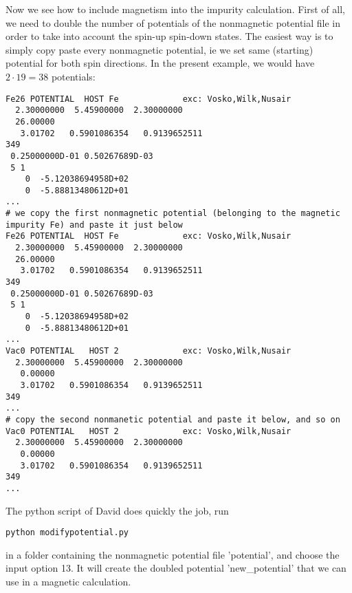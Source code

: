 \documentclass[a4paper,10pt,fullpage]{report}
\begin{document}
Now we see how to include magnetism into the impurity calculation. 
First of all, we need to double the number of potentials of the nonmagnetic potential file in order
to take into account the spin-up spin-down states. 
The easiest way is to simply copy paste every nonmagnetic potential, 
ie we set same (starting) potential for both spin directions. In the present example, we
would have $2\cdot19=38$ potentials:
\begin{verbatim}
Fe26 POTENTIAL  HOST Fe             exc: Vosko,Wilk,Nusair
  2.30000000  5.45900000  2.30000000
  26.00000
   3.01702   0.5901086354   0.9139652511
349
 0.25000000D-01 0.50267689D-03
 5 1
    0  -5.12038694958D+02
    0  -5.88813480612D+01
...
# we copy the first nonmagnetic potential (belonging to the magnetic impurity Fe) and paste it just below
Fe26 POTENTIAL  HOST Fe             exc: Vosko,Wilk,Nusair
  2.30000000  5.45900000  2.30000000
  26.00000
   3.01702   0.5901086354   0.9139652511
349
 0.25000000D-01 0.50267689D-03
 5 1
    0  -5.12038694958D+02
    0  -5.88813480612D+01
...
Vac0 POTENTIAL   HOST 2             exc: Vosko,Wilk,Nusair
  2.30000000  5.45900000  2.30000000
   0.00000
   3.01702   0.5901086354   0.9139652511
349
...
# copy the second nonmanetic potential and paste it below, and so on
Vac0 POTENTIAL   HOST 2             exc: Vosko,Wilk,Nusair
  2.30000000  5.45900000  2.30000000
   0.00000
   3.01702   0.5901086354   0.9139652511
349
...
\end{verbatim}
The python script of David does quickly the job, run
\begin{verbatim}
python modifypotential.py
\end{verbatim}
in a folder containing the nonmagnetic potential file 'potential', and choose the
input option 13. It will create the doubled potential 'new\_potential' that we can use
in a magnetic calculation.
\end{document}
